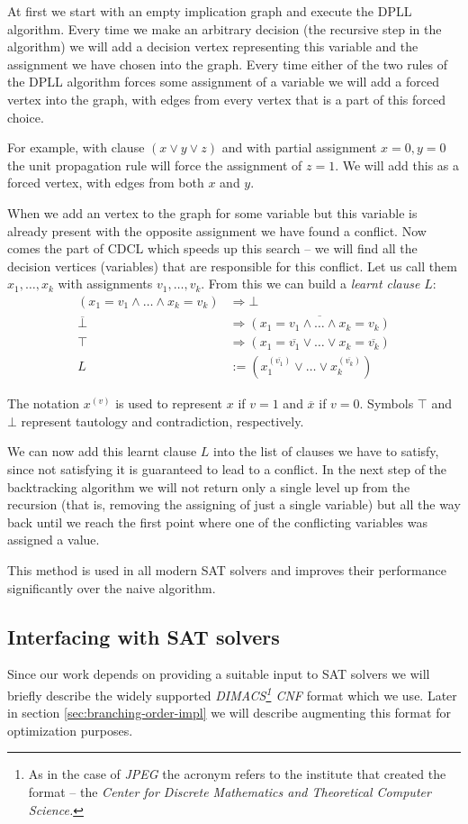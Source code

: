At first we start with an empty implication graph and execute the DPLL algorithm.
Every time we make an arbitrary decision (the recursive step in the algorithm) we will add a decision vertex representing this variable and the assignment we have chosen into the graph.
Every time either of the two rules of the DPLL algorithm forces some assignment of a variable we will add a forced vertex into the graph, with edges from every vertex that is a part of this forced choice.

For example, with clause $(x \lor y \lor z)$ and with partial assignment $x=0, y=0$ the unit propagation rule will force the assignment of $z=1$.
We will add this as a forced vertex, with edges from both $x$ and $y$.

When we add an vertex to the graph for some variable but this variable is already present with the opposite assignment we have found a conflict.
Now comes the part of CDCL which speeds up this search -- we will find all the decision vertices (variables) that are responsible for this conflict.
Let us call them $x_1, \dots, x_k$ with assignments $v_1, \dots, v_k$.
From this we can build a \emph{learnt clause} $L$:
\begin{align*}
(x_1 = v_1 \land \dots \land x_k = v_k) &\Rightarrow \bot \\
\overline{\bot} &\Rightarrow \overline{(x_1 = v_1 \land \dots \land x_k = v_k)} \\
\top &\Rightarrow (x_1 = \overline{v_1} \lor \dots \lor x_k = \overline{v_k}) \\
L &:= (x_1^{(\overline{v_1})} \lor \dots \lor x_k^{(\overline{v_k})})
\end{align*}

The notation $x^{(v)}$ is used to represent $x$ if $v=1$ and $\overline{x}$ if $v=0$. Symbols $\top$ and $\bot$ represent tautology and contradiction, respectively.

We can now add this learnt clause $L$ into the list of clauses we have to satisfy, since not satisfying it is guaranteed to lead to a conflict.
In the next step of the backtracking algorithm we will not return only a single level up from the recursion (that is, removing the assigning of just a single variable) but all the way back until we reach the first point where one of the conflicting variables was assigned a value.

This method is used in all modern SAT solvers and improves their performance significantly over the naive algorithm.

\subsection{Interfacing with SAT solvers}
\label{sec:dimacs}
Since our work depends on providing a suitable input to SAT solvers we will briefly describe the widely supported \emph{DIMACS\footnote{As in the case of \emph{JPEG} the acronym refers to the institute that created the format -- the \emph{Center for Discrete Mathematics and Theoretical Computer Science.}} CNF} format which we use.
Later in section \ref{sec:branching-order-impl} we will describe augmenting this format for optimization purposes.

